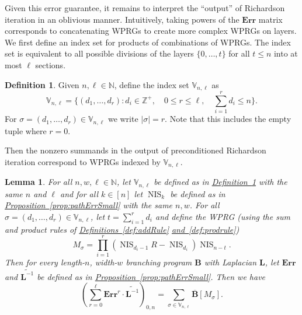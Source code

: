 \documentclass[11pt]{article}
\numberwithin{equation}{section}
\newtheorem{lemma}[theorem]{Lemma}
\theoremstyle{definition}
\newtheorem{definition}[theorem]{Definition}
\theoremstyle{plain}
\newcommand{\Z}{\mathbb Z}
\newcommand{\N}{\mathbb N}
\newcommand{\expref}[2]{\hyperref[#2]{#1~\ref{#2}}}
\newcommand{\mL}{\mathbf{L}}
\newcommand{\vnl}{\mathbb{V}_{n,\ell}}
\newcommand{\Lt}{\widetilde{\mathbf{L}^{-1}}}
\newcommand{\Err}{\mathbf{Err}}
\newcommand{\nis}[1][ ]{\operatorname{NIS}_{#1}}
\newcommand{\bp}{{\mathbf{B}}}
\newcommand{\bbp}{\overline{\mathbf{B}}}
\begin{document}
Given this error guarantee, it remains to interpret the ``output'' of Richardson iteration in an oblivious manner. Intuitively, taking powers of the $\Err$ matrix corresponds to concatenating WPRGs to create more complex WPRGs on layers. We first define an index set for products of combinations of WPRGs. The index set is equivalent to all possible divisions of the layers $\{0,\ldots,t\}$ for all $t\leq n$ into at most $\ell$ sections.
\begin{definition}\label{def:pathIndex}
Given $n,\ell \in \N$, define the index set $\vnl$ as
\[\vnl = \{(d_1,\dots, d_r) : d_i\in \Z^+, \quad 0\leq r\leq \ell,\quad \sum_{i=1}^rd_i\leq n\}.\]
For $\sigma=(d_1,\dots,d_r) \in \vnl$ we write $|\sigma|=r$. Note that this includes the empty tuple where $r=0$.
\end{definition}
Then the nonzero summands in the output of preconditioned %
Richardson  %
iteration correspond to WPRGs indexed by $\vnl$.
\begin{lemma}\label{lem:richardSummandsPath}
For all $n,w,\ell \in \N$, let $\vnl$ be defined as in \expref{Definition}{def:pathIndex} with the same $n$ and $\ell$ and for all $k\in[n]$ let $\nis[k]$ be defined as in \expref{Proposition}{prop:pathErrSmall} with the same $n,w$. For all $\sigma=(d_1,\dots,d_r) \in \vnl$, let $t=\sum_{i=1}^rd_i$ and define the WPRG (using the sum and product rules of 
%
\expref{Definitions}{def:addRule} \expref{and}{def:prodrule})  %
\[M_\sigma = \prod_{i=1}^r\left(\nis[d_i-1]R-\nis[d_i]\right)\nis[n-t].\]
Then for every length-$n$, width-$w$ branching program $\bp$ with Laplacian $\mL$, let $\Err$ and $\Lt$ be defined as in \expref{Proposition}{prop:pathErrSmall}. Then we have
\[\left(\sum_{r=0}^\ell\Err^r\cdot \Lt\right)_{0,n} = \sum_{\sigma \in \vnl}\bbp[M_\sigma].\]
\end{lemma}
\end{document}
